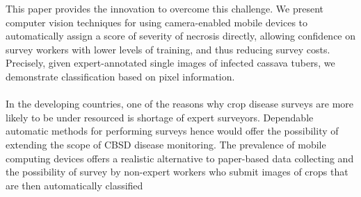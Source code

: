 \documentclass[conference]{IEEEtran}
\begin{document}
This paper provides the innovation to overcome this challenge. We present computer vision techniques for using camera-enabled mobile devices to automatically assign a score of severity of necrosis directly, allowing confidence on survey workers with lower levels of training, and thus reducing survey costs. Precisely, given expert-annotated single images of infected cassava tubers, we demonstrate classification based on pixel information.\\ \\ In the developing countries, one of the reasons why crop disease surveys are more likely to be under resourced is shortage of expert surveyors. Dependable automatic methods for performing surveys hence would offer the possibility of extending the scope of CBSD disease monitoring. The prevalence of mobile computing devices offers a realistic alternative to paper-based data collecting and the possibility of survey by non-expert workers who submit images of crops that are then automatically classified
\end{document}
